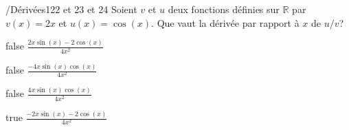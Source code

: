         	\begin{question}{/}{Dérivées}{1}{22 et 23 et 24}
				Soient $v$ et $u$ deux fonctions définies sur $\mathbb{R}$ par $v(x)=2x$ et $u(x)=\cos(x)$. Que vaut la dérivée par rapport à $x$ de $u/v$?
            \end{question}
            \begin{reponses}
            	\item[false] $\frac{2x\sin(x)-2\cos(x)}{4x^2}$
            	\item[false] $\frac{-4x\sin(x)\cos(x)}{4x^2}$
                \item[false] $\frac{4x\sin(x)\cos(x)}{4x^2}$
                \item[true] $\frac{-2x\sin(x)-2\cos(x)}{4x^2}$
            \end{reponses}
